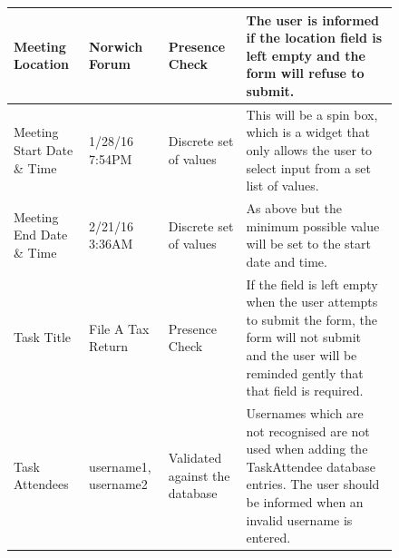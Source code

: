 \begin{figure}
\begin{table}[width=\textwidth]
\begin{tabular}{llll}
\multicolumn{1}{|l|}{Meeting Location}           & \multicolumn{1}{l|}{Norwich Forum}                                    & \multicolumn{1}{l|}{Presence Check}                                          & \multicolumn{1}{l|}{The user is informed if the location field is left empty and the form will refuse to submit.}                                                                                                                                                                                                \\ \hline
\multicolumn{1}{|l|}{Meeting Start Date \& Time} & \multicolumn{1}{l|}{1/28/16 7:54PM}                                   & \multicolumn{1}{l|}{Discrete set of values}                                  & \multicolumn{1}{l|}{This will be a spin box, which is a widget that only allows the user to select input from a set list of values.}                                                                                                                                                                             \\ \hline
\multicolumn{1}{|l|}{Meeting End Date \& Time}   & \multicolumn{1}{l|}{2/21/16 3:36AM}                                   & \multicolumn{1}{l|}{Discrete set of values}                                  & \multicolumn{1}{l|}{As above but the minimum possible value will be set to the start date and time.}                                                                                                                                                                                                             \\ \hline
\multicolumn{1}{|l|}{Task Title}                 & \multicolumn{1}{l|}{File A Tax Return}                                & \multicolumn{1}{l|}{Presence Check}                                          & \multicolumn{1}{l|}{If the field is left empty when the user attempts to submit the form, the form will not submit and the user will be reminded gently that that field is required.}                                                                                                                            \\ \hline
\multicolumn{1}{|l|}{Task Attendees}             & \multicolumn{1}{l|}{username1, username2}                             & \multicolumn{1}{l|}{Validated against the database}                          & \multicolumn{1}{l|}{Usernames which are not recognised are not used when adding the TaskAttendee database entries. The user should be informed when an invalid username is entered.}                                                                                                                             \\ \hline

\end{tabular}
\end{table}
\end{figure}

